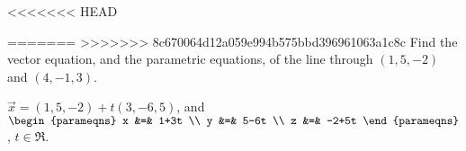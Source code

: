 
\begin{Exercise}[
name={},
title={}, 
difficulty=0,
origin={\cite{SM}}]
<<<<<<< HEAD

=======
>>>>>>> 8c670064d12a059e994b575bbd396961063a1c8c
Find the vector equation, and the parametric equations, of the line through $(1,5,-2)$ and $(4,-1,3)$.

\end{Exercise}

\begin{Answer}
$\vec{x} = (1,5,-2)+t(3,-6,5)$, and $\begin{parameqns} x &=& 1+3t \\ y &=& 5-6t \\ z &=& -2+5t \end{parameqns}$, $t\in\Re$.
\end{Answer}
